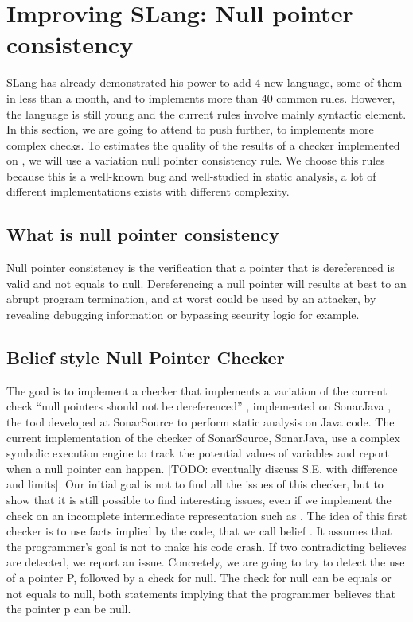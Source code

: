 \section{Improving SLang: Null pointer consistency}
\label{sec:improving_slang}

SLang has already demonstrated his power to add 4 new language, some of them in less than a month, and to implements more than 40 common rules. 
However, the language is still young and the current rules involve mainly syntactic element. 
In this section, we are going to attend to push \slang further, to implements more complex checks.
To estimates the quality of the results of a checker implemented on \slang, we will use a variation null pointer consistency rule. 
We choose this rules because this is a well-known bug and well-studied in static analysis, a lot of different implementations exists with different complexity.

\subsection{What is null pointer consistency}
\label{subsec:null_pointer_consistency}

Null pointer consistency is the verification that a pointer that is dereferenced is valid and not equals to null. Dereferencing a null pointer will results at best to an abrupt program termination, and at worst could be used by an attacker, by revealing debugging information or bypassing security logic for example.

\subsection{Belief style Null Pointer Checker}
\label{subsec:belief_style}

The goal is to implement a checker that implements a variation of the current check “null pointers should not be dereferenced” \cite{RSPEC-2259:2019:Online}, implemented on SonarJava \cite{SonarJava:2019:Online}, the tool developed at SonarSource to perform static analysis on Java code.
The current implementation of the checker of SonarSource, SonarJava, use a complex symbolic execution engine to track the potential values of variables and report when a null pointer can happen.
[TODO: eventually discuss S.E. with difference and limits].
Our initial goal is not to find all the issues of this checker, but to show that it is still possible to find interesting issues, even if we implement the check on an incomplete intermediate representation such as \slang.
The idea of this first checker is to use facts implied by the code, that we call belief \cite{Engler:2001:BDB:502059.502041}.
It assumes that the programmer’s goal is not to make his code crash. If two contradicting believes are detected, we report an issue.
Concretely, we are going to try to detect the use of a pointer P, followed by a check for null. The check for null can be equals or not equals to null, both statements implying that the programmer believes that the pointer p can be null.

